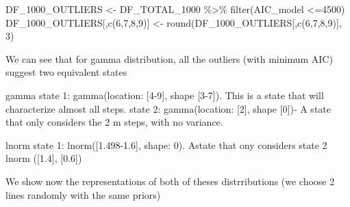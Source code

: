 \documentclass[
]{article}
\newenvironment{Shaded}{\begin{snugshade}}{\end{snugshade}}
\newcommand{\DecValTok}[1]{\textcolor[rgb]{0.00,0.00,0.81}{#1}}
\newcommand{\FunctionTok}[1]{\textcolor[rgb]{0.00,0.00,0.00}{#1}}
\newcommand{\NormalTok}[1]{#1}
\newcommand{\OtherTok}[1]{\textcolor[rgb]{0.56,0.35,0.01}{#1}}
\newcommand{\SpecialCharTok}[1]{\textcolor[rgb]{0.00,0.00,0.00}{#1}}
\begin{document}
\begin{Shaded}
\begin{Highlighting}[]
\NormalTok{DF\_1000\_OUTLIERS }\OtherTok{\textless{}{-}}\NormalTok{ DF\_TOTAL\_1000 }\SpecialCharTok{\%\textgreater{}\%}
  \FunctionTok{filter}\NormalTok{(AIC\_model }\SpecialCharTok{\textless{}=}\DecValTok{4500}\NormalTok{)}
\NormalTok{DF\_1000\_OUTLIERS[,}\FunctionTok{c}\NormalTok{(}\DecValTok{6}\NormalTok{,}\DecValTok{7}\NormalTok{,}\DecValTok{8}\NormalTok{,}\DecValTok{9}\NormalTok{)] }\OtherTok{\textless{}{-}} \FunctionTok{round}\NormalTok{(DF\_1000\_OUTLIERS[,}\FunctionTok{c}\NormalTok{(}\DecValTok{6}\NormalTok{,}\DecValTok{7}\NormalTok{,}\DecValTok{8}\NormalTok{,}\DecValTok{9}\NormalTok{)], }\DecValTok{3}\NormalTok{)}
\end{Highlighting}
\end{Shaded}

We can see that for gamma distribution, all the outliers (with minimum
AIC) suggest two equivalent states

gamma state 1: gamma(location: {[}4-9{]}, shape {[}3-7{]}). This is a
state that will characterize almost all steps. state 2: gamma(location:
{[}2{]}, shape {[}0{]})- A state that only considers the 2 m steps, with
no variance.

lnorm state 1: lnorm({[}1.498-1.6{]}, shape: 0). Astate that ony
considers state 2 lnorm ({[}1.4{]}, {[}0.6{]})

We show now the representations of both of theses distrributions (we
choose 2 lines randomly with the same priors)
\end{document}
